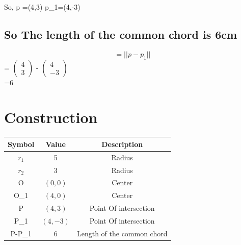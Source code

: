 \documentclass[journal,12pt,twocolumn]{article}
\newcommand{\myvec}[1]{\ensuremath{\begin{pmatrix}#1\end{pmatrix}}}
\begin{document}
    So, p =(4,3)
    \hspace{5mm}
    p_1=(4,-3)
\subsection{ So The length of the common chord is 6cm}
   $$= || p - p_1|| $$
        = \myvec{4\\ 3} - \myvec{4 \\ -3} \\
        \vspace{5mm}
        =6
  \section*{\large Construction}
{
\setlength\extrarowheight{5pt}
\begin{tabular}{|c|c|c|}
  \hline
  \textbf{Symbol}&\textbf{Value}&\textbf{Description}\\
  \hline
	$r_1$&5&Radius \\
  \hline
	$r_2$&3&Radius\\
  \hline
  O&$(0,0)$&Center\\
  \hline
  O_1& $(4,0)$ &Center\\
  \hline
  P&$(4,3)$&Point Of intersection\\
  \hline
  P_1&$(4,-3)$&Point Of intersection\\
  \hline
  P-P_1& $6$ &Length of the common chord\\
  \hline
  
  
\end{tabular}
}
\end{document}
